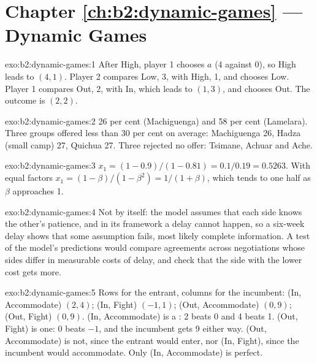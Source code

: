 \section*{Chapter \ref{ch:b2:dynamic-games} --- Dynamic Games}

\begin{solution}{exo:b2:dynamic-games:1}
After High, player 1 chooses $a$ (4 against 0), so High leads to $(4, 1)$. Player 2 compares Low, 3, with High, 1, and
chooses Low. Player 1 compares Out, 2, with In, which leads to $(1, 3)$, and chooses Out. The outcome is $(2, 2)$.
\end{solution}

\begin{solution}{exo:b2:dynamic-games:2}
26 per cent (Machiguenga) and 58 per cent (Lamelara). Three groups offered less than 30 per cent on average:
Machiguenga 26, Hadza (small camp) 27, Quichua 27. Three rejected no offer: Tsimane, Achuar and Ache.
\end{solution}

\begin{solution}{exo:b2:dynamic-games:3}
$x_1 = (1 - 0.9)/(1 - 0.81) = 0.1/0.19 = 0.5263$. With equal factors $x_1 = (1 - \beta)/(1 - \beta^2) = 1/(1 + \beta)$, which tends to one
half as $\beta$ approaches 1.
\end{solution}

\begin{solution}{exo:b2:dynamic-games:4}
Not by itself: the model assumes that each side knows the other's patience, and in its framework a delay
cannot happen, so a six-week delay shows that some assumption fails, most likely complete information. A test of
the model's predictions would compare agreements across negotiations whose sides differ in measurable costs of
delay, and check that the side with the lower cost gets more.
\end{solution}

\begin{solution}{exo:b2:dynamic-games:5}
Rows for the entrant, columns for the incumbent: (In, Accommodate) $(2, 4)$; (In, Fight) $(-1, 1)$; (Out,
Accommodate) $(0, 9)$; (Out, Fight) $(0, 9)$. (In, Accommodate) is a : 2 beats 0 and 4 beats 1. (Out,
Fight) is one: 0 beats $-1$, and the incumbent gets 9 either way. (Out, Accommodate) is not, since the entrant would
enter, nor (In, Fight), since the incumbent would accommodate. Only (In, Accommodate) is  perfect.
\end{solution}

